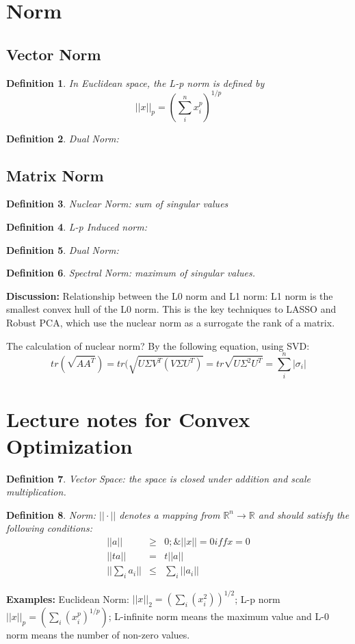 \documentclass[12pt]{article}
\newtheorem{definition}{Definition}[section]
\begin{document}
\section{Norm}
\subsection{Vector Norm}
\begin{definition}
	In Euclidean space, the L-p norm is defined by 
	\[
		||x||_p = (\sum_i^n x_i^p)^{1/p}
	\]
\end{definition}
\begin{definition}
	Dual Norm:
\end{definition}

\subsection{Matrix Norm}
\begin{definition}
	Nuclear Norm: sum of singular values
\end{definition}
\begin{definition}
	L-p Induced norm:
\end{definition}
\begin{definition}
	Dual Norm:
\end{definition}
\begin{definition}
	Spectral Norm: maximum of singular values.
\end{definition}

{\bf Discussion:} Relationship between the L0 norm and L1 norm: L1 norm is the smallest convex hull of the L0 norm. This is the key techniques to LASSO and Robust PCA, which use the nuclear norm as a surrogate the rank of a matrix. 

The calculation of nuclear norm? By the following equation, using SVD:
\[
tr(\sqrt{AA^T}) = tr(\sqrt{U\Sigma V^T (V\Sigma U^T)} = tr\sqrt{U\Sigma^2U^T} = \sum_i^n |\sigma_i|
\]
\section{Lecture notes for Convex Optimization}
\begin{definition}
	Vector Space: the space is closed under addition and scale multiplication.
\end{definition}
\begin{definition}
	Norm: $||\cdot||$ denotes a mapping from $\mathbb{R}^n\to \mathbb{R}$ and should satisfy the following conditions:
	\begin{eqnarray}
		||a||&\ge& 0; \& ||x||=0 iff x=0 \\
		||ta|| &=& t||a||\\
		||\sum_i a_i|| &\le& \sum_i ||a_i||
	\end{eqnarray}
\end{definition}
{\bf Examples:} Euclidean Norm: $||x||_2 = (\sum_i(x_i^2))^{1/2}$; L-p norm $||x||_p=(\sum_i(x_i^p)^{1/p})$; L-infinite norm means the maximum value and L-0 norm means the number of non-zero values.
\end{document}
